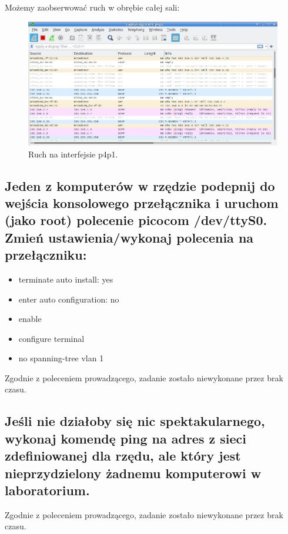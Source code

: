 \documentclass[polish, a4paper]{article}
\begin{document}
Możemy zaobserwować ruch w obrębie całej sali:

\begin{figure}[H]
\centering
\includegraphics[width=\textwidth]{calasiec.png}
\caption{Ruch na interfejsie p4p1.}
\end{figure}

\subsection{Jeden z komputerów w rzędzie podepnij do wejścia
konsolowego przełącznika i uruchom (jako root) polecenie
picocom /dev/ttyS0. Zmień ustawienia/wykonaj polecenia
na przełączniku:}

\begin{itemize}
    \item terminate auto install: yes
    \item enter auto configuration: no
\item enable
\item configure terminal
\item no spanning-tree vlan 1
\end{itemize}

Zgodnie z poleceniem prowadzącego, zadanie zostało niewykonane przez brak czasu.

\subsection{Jeśli nie działoby się nic spektakularnego, wykonaj komendę
ping na adres z sieci zdefiniowanej dla rzędu, ale który jest
nieprzydzielony żadnemu komputerowi w laboratorium.}

Zgodnie z poleceniem prowadzącego, zadanie zostało niewykonane przez brak czasu.
\end{document}
